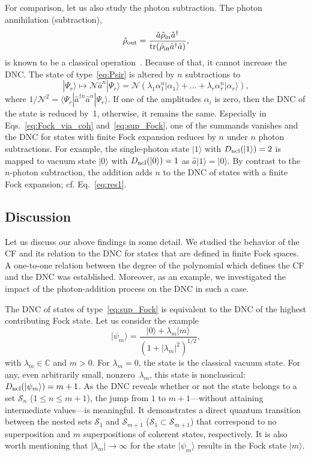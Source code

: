 \documentclass[aps,pra,twocolumn,showpacs,superscriptaddress,10pt]{revtex4-1}
\begin{document}
	For comparison, let us also study the photon subtraction.
	The photon annihilation (subtraction),
	\begin{equation}
	  \hat\rho_{\rm out}=\frac{\hat{a}\hat{\rho}_{\rm in}\hat{a}^\dag}{{\rm tr}(\hat{\rho}_{\rm in}\hat{a}^\dag\hat{a})},
	\end{equation}
	is known to be a classical operation~\cite{Gehrke2012}.
	Because of that, it cannot increase the DNC.
	The state of type~\eqref{eq:Psir} is altered by $n$ subtractions to
	\begin{equation}
		|\Psi_r\rangle\mapsto
		\mathcal N\hat{a}^n|\Psi_r\rangle=\mathcal{N}\left(\lambda_1\alpha_1^n|\alpha_1\rangle+\dots+\lambda_r\alpha_r^n|\alpha_r\rangle\right),
	\end{equation}
	where $1/\mathcal{N}^2=\langle\Psi_r|\hat{a}^{\dag n}\hat{a}^n|\Psi_r\rangle$.
	If one of the amplitudes $\alpha_i$ is zero, then the DNC of the state is reduced by~1, otherwise, it remains the same.
	Especially in Eqs.~\eqref{eq:Fock_via_coh} and~\eqref{eq:sup_Fock}, one of the summands vanishes and the DNC for states with finite Fock expansion reduces by $n$ under $n$ photon subtractions.
	For example, the single-photon state $|1\rangle$ with $D_{\rm ncl}(|1\rangle)=2$ is mapped to vacuum state $|0\rangle$ with $D_{\rm ncl}(|0\rangle)=1$ as $\hat{a}|1\rangle=|0\rangle$.
	By contrast to the $n$-photon subtraction, the addition adds $n$ to the DNC of states with a finite Fock expansion; cf. Eq.~\eqref{eq:res1}.

\subsection{Discussion}
	Let us discuss our above findings in some detail.
	We studied the behavior of the CF and its relation to the DNC for states that are defined in finite Fock spaces.
	A one-to-one relation between the degree of the polynomial which defines the CF and the DNC was established.
	Moreover, as an example, we investigated the impact of the photon-addition process on the DNC in such a case.

	The DNC of states of type~\eqref{eq:sup_Fock} is equivalent to the DNC of the highest contributing Fock state. 
	Let us consider the example
	\begin{equation}\label{eq:example_ref}
		|\psi_{m}\rangle=\frac{|0\rangle+\lambda_m|m\rangle}{(1+|\lambda_m|^2)^{1/2}},
	\end{equation}
	with $\lambda_m\in\mathbb{C}$ and $m>0$.
	For $\lambda_m=0$, the state is the classical vacuum state.
	For any, even arbitrarily small, nonzero~$\lambda_m$, this state is nonclassical: $D_{\rm ncl}(|\psi_m\rangle)={m+1}$.
	As the DNC reveals whether or not the state belongs to a set $\mathcal{S}_{n}$ ($1\leqslant n\leqslant m+1$), the jump from $1$ to $m+1$---without attaining intermediate values---is meaningful.
	It demonstrates a direct quantum transition between the nested sets $\mathcal{S}_{1}$ and $\mathcal{S}_{m+1}$ ($\mathcal{S}_{1}\subset\mathcal{S}_{m+1}$) that correspond to no superposition and $m$ superpositions of coherent states, respectively.
	It is also worth mentioning that $|\lambda_m|\to\infty$ for the state $|\psi_{m}\rangle$ results in the Fock state $|m\rangle$.
\end{document}
